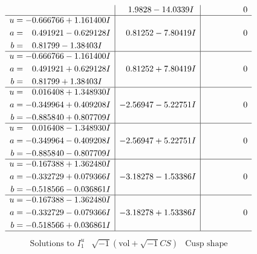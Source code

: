 \documentclass[1p]{elsarticle_modified}
\theoremstyle{definition}
\newcommand{\I}{\sqrt{-1}}
\begin{document}
$$\begin{array}{c|c|c}
 & \phantom{-}1.9828 - 14.0339 I & \phantom{-0.000000 } 0 \\ \hline\begin{aligned}
u &= -0.666766 + 1.161400 I \\
a &= \phantom{-}0.491921 - 0.629128 I \\
b &= \phantom{-}0.81799 - 1.38403 I\end{aligned}
 & \phantom{-}0.81252 - 7.80419 I & \phantom{-0.000000 } 0 \\ \hline\begin{aligned}
u &= -0.666766 - 1.161400 I \\
a &= \phantom{-}0.491921 + 0.629128 I \\
b &= \phantom{-}0.81799 + 1.38403 I\end{aligned}
 & \phantom{-}0.81252 + 7.80419 I & \phantom{-0.000000 } 0 \\ \hline\begin{aligned}
u &= \phantom{-}0.016408 + 1.348930 I \\
a &= -0.349964 + 0.409208 I \\
b &= -0.885840 + 0.807709 I\end{aligned}
 & -2.56947 - 5.22751 I & \phantom{-0.000000 } 0 \\ \hline\begin{aligned}
u &= \phantom{-}0.016408 - 1.348930 I \\
a &= -0.349964 - 0.409208 I \\
b &= -0.885840 - 0.807709 I\end{aligned}
 & -2.56947 + 5.22751 I & \phantom{-0.000000 } 0 \\ \hline\begin{aligned}
u &= -0.167388 + 1.362480 I \\
a &= -0.332729 + 0.079366 I \\
b &= -0.518566 - 0.036861 I\end{aligned}
 & -3.18278 - 1.53386 I & \phantom{-0.000000 } 0 \\ \hline\begin{aligned}
u &= -0.167388 - 1.362480 I \\
a &= -0.332729 - 0.079366 I \\
b &= -0.518566 + 0.036861 I\end{aligned}
 & -3.18278 + 1.53386 I & \phantom{-0.000000 } 0\\
 \hline 
 \end{array}$$\newpage$$\begin{array}{c|c|c}  
\text{Solutions to }I^u_{1}& \I (\text{vol} + \sqrt{-1}CS) & \text{Cusp shape}\\

\end{array}$$
\end{document}
